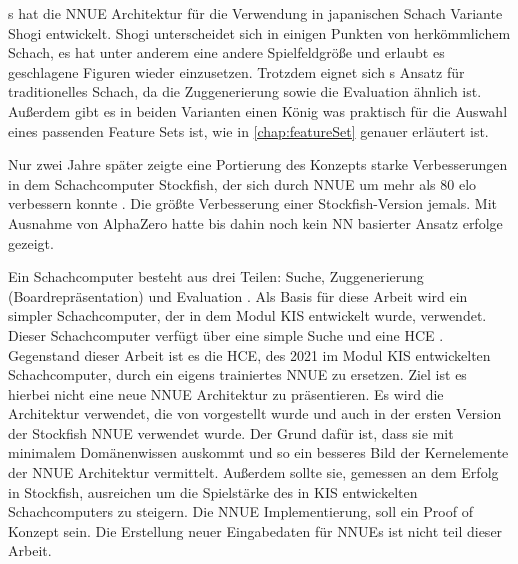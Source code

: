 \citeauthor{YNasu2018}s \cite{YNasu2018} hat die \ac{NNUE} Architektur für die Verwendung in japanischen Schach Variante Shogi entwickelt. Shogi unterscheidet sich in einigen Punkten von herkömmlichem Schach, es hat unter anderem eine andere Spielfeldgröße und erlaubt es geschlagene Figuren wieder einzusetzen. Trotzdem eignet sich \citeauthor{YNasu2018}s \cite{YNasu2018} Ansatz für traditionelles Schach, da die Zuggenerierung sowie die Evaluation ähnlich ist. Außerdem gibt es in beiden Varianten einen König was praktisch für die Auswahl eines passenden Feature Sets ist, wie in \autoref{chap:featureSet} genauer erläutert ist.

Nur zwei Jahre später zeigte eine Portierung des Konzepts starke Verbesserungen in dem Schachcomputer Stockfish, der sich durch \ac{NNUE} um mehr als 80 elo verbessern konnte \cite{StockfishIntroducingNNUE}. Die größte Verbesserung einer Stockfish-Version jemals. Mit Ausnahme von AlphaZero \cite{Silver2017} hatte bis dahin noch kein \ac{NN} basierter Ansatz erfolge gezeigt.


Ein Schachcomputer besteht aus drei Teilen: Suche, Zuggenerierung (Boardrepräsentation) und Evaluation \cite{VazquezFernandez2013}. Als Basis für diese Arbeit wird ein simpler Schachcomputer, der in dem Modul \ac{KIS} entwickelt wurde, verwendet. Dieser Schachcomputer verfügt über eine simple Suche und eine \ac{HCE} \cite{nopy}. Gegenstand dieser Arbeit ist es die \ac{HCE}, des 2021 im Modul \ac{KIS} entwickelten Schachcomputer, durch ein eigens trainiertes \ac{NNUE} zu ersetzen. Ziel ist es hierbei nicht eine neue \ac{NNUE} Architektur zu präsentieren. Es wird die Architektur verwendet, die von \citeauthor{YNasu2018} \cite{YNasu2018} vorgestellt wurde und auch in der ersten Version der Stockfish \ac{NNUE} verwendet wurde. Der Grund dafür ist, dass sie mit minimalem Domänenwissen auskommt und so ein besseres Bild der Kernelemente der \ac{NNUE} Architektur vermittelt. Außerdem sollte sie, gemessen an dem Erfolg in Stockfish, ausreichen um die Spielstärke des in \ac{KIS} entwickelten Schachcomputers zu steigern.
Die \ac{NNUE} Implementierung, soll ein Proof of Konzept sein. Die Erstellung neuer Eingabedaten für \acp{NNUE} ist nicht teil dieser Arbeit.